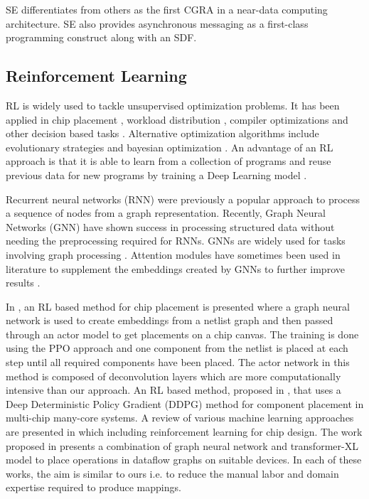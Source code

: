 SE differentiates from others as the first CGRA in a near-data computing architecture.
SE also provides asynchronous messaging as a first-class programming construct along with an SDF. 


\subsection{Reinforcement Learning}
RL is widely used to tackle unsupervised optimization problems.
It has been applied in chip placement \cite{mirhoseini2020chip}, workload distribution \cite{Mirhoseini_placementRNN, addanki2019placeto, zhou2019gdp}, compiler optimizations \cite{Zhou_compileGNN} and other decision based tasks \cite{kormushev2013reinforcement, ZophL16_NASRL}. 
Alternative optimization algorithms include evolutionary strategies \cite{Zhichao_ESNAS} and bayesian optimization \cite{shi2020learned}. 
An advantage of an RL approach is that it is able to learn from a collection of programs and reuse previous data for new programs by training a Deep Learning model \cite{zhou2019gdp}.

Recurrent neural networks (RNN) \cite{hochreiter1996lstm} were previously a popular approach to process a sequence of nodes from a graph representation. 
Recently, Graph Neural Networks (GNN) \cite{gori2005new} have shown success in processing structured data without needing the preprocessing required for RNNs.
GNNs are widely used for tasks involving graph processing \cite{Zhou_compileGNN, zhou2019gdp}. 
Attention modules have sometimes been used in literature to supplement the embeddings created by GNNs to further improve results \cite{addanki2019placeto}.

In \cite{mirhoseini2020chip}, an RL based method for chip placement is presented where a graph neural network is used to create embeddings from a netlist graph and then passed through an actor model to get placements on a chip canvas.
The training is done using the PPO approach and one component from the netlist is placed at each step until all required components have been placed.
The actor network in this method is composed of deconvolution layers which are more computationally intensive than our approach. 
An RL based method, proposed in \cite{wu_core_2020}, that uses a Deep Deterministic Policy Gradient (DDPG) method for component placement in multi-chip many-core systems.
A review of various machine learning approaches are presented in \cite{khailany_accelerating_2020} which including reinforcement learning for chip design.
The work proposed in \cite{zhou2019gdp} presents a combination of graph neural network and transformer-XL model to place operations in dataflow graphs on suitable devices.
In each of these works, the aim is similar to ours i.e. to reduce the manual labor and domain expertise required to produce mappings.

